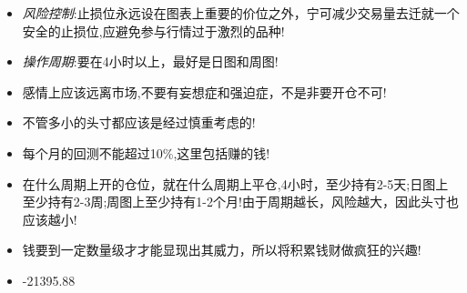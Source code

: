 
\begin{itemize}

\item \textit{风险控制}:止损位永远设在图表上重要的价位之外，宁可减少交易量去迁就一个安全的止损位,应避免参与行情过于激烈的品种!
\item \textit{操作周期}:要在4小时以上，最好是日图和周图!
\item 感情上应该远离市场,不要有妄想症和强迫症，不是非要开仓不可!
\item 不管多小的头寸都应该是经过慎重考虑的!
\item 每个月的回测不能超过10\%,这里包括赚的钱!
\item 在什么周期上开的仓位，就在什么周期上平仓,4小时，至少持有2-5天;日图上至少持有2-3周;周图上至少持有1-2个月!由于周期越长，风险越大，因此头寸也应该越小!
\item 钱要到一定数量级才才能显现出其威力，所以将积累钱财做疯狂的兴趣!

\item -21395.88


\end{itemize}








